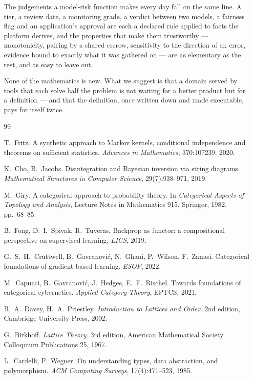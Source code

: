 \documentclass[11pt,a4paper]{article}
\renewcommand{\_}{\oldunderscore\allowbreak}
\theoremstyle{plain}
\theoremstyle{definition}
\theoremstyle{definition}
\theoremstyle{remark}
\begin{document}
The judgements a model-risk function makes every day fall on the same line. A tier, a review date, a
monitoring grade, a verdict between two models, a fairness flag and an application's approval are each a
declared rule applied to facts the platform derives, and the properties that make them trustworthy ---
monotonicity, pairing by a shared escrow, sensitivity to the direction of an error, evidence bound to exactly
what it was gathered on --- are as elementary as the rest, and as easy to leave out.

None of the mathematics is new. What we suggest is that a domain served by tools that each solve half the
problem is not waiting for a better product but for a definition --- and that the definition, once written
down and made executable, pays for itself twice.

\begin{thebibliography}{99}
\small

 T.~Fritz. A synthetic approach to Markov kernels, conditional independence and
theorems on sufficient statistics. \emph{Advances in Mathematics}, 370:107239, 2020.

 K.~Cho, B.~Jacobs. Disintegration and Bayesian inversion via string diagrams.
\emph{Mathematical Structures in Computer Science}, 29(7):938--971, 2019.

 M.~Giry. A categorical approach to probability theory. In \emph{Categorical Aspects of
Topology and Analysis}, Lecture Notes in Mathematics 915, Springer, 1982, pp.~68--85.

 B.~Fong, D.~I.~Spivak, R.~Tuyeras. Backprop as functor: a compositional perspective
on supervised learning. \emph{LICS}, 2019.

 G.~S.~H.~Cruttwell, B.~Gavranovi\'c, N.~Ghani, P.~Wilson, F.~Zanasi.
Categorical foundations of gradient-based learning. \emph{ESOP}, 2022.

 M.~Capucci, B.~Gavranovi\'c, J.~Hedges, E.~F.~Rischel. Towards foundations of
categorical cybernetics. \emph{Applied Category Theory}, EPTCS, 2021.

 B.~A.~Davey, H.~A.~Priestley. \emph{Introduction to Lattices and Order}. 2nd edition,
Cambridge University Press, 2002.

 G.~Birkhoff. \emph{Lattice Theory}. 3rd edition, American Mathematical Society
Colloquium Publications 25, 1967.

 L.~Cardelli, P.~Wegner. On understanding types, data abstraction, and polymorphism.
\emph{ACM Computing Surveys}, 17(4):471--523, 1985.


\end{thebibliography}
\end{document}
